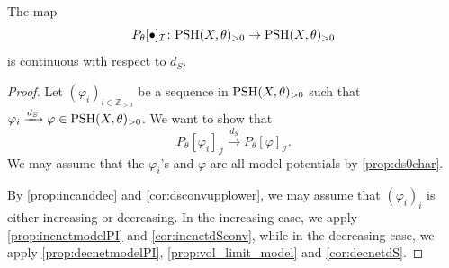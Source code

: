 \begin{theorem}\label{thm:contPI}
    The map
    \[
        P_{\theta}[\bullet]_{\mathcal{I}}\colon \mathrm{PSH}(X,\theta)_{>0}\rightarrow \mathrm{PSH}(X,\theta)_{>0}
    \]
    is continuous with respect to $d_S$.
   \end{theorem}
   \begin{proof}
       Let $(\varphi_i)_{i\in \mathbb{Z}_{>0}}$ be a sequence in $\mathrm{PSH}(X,\theta)_{>0}$ such that $\varphi_i\xrightarrow{d_S}\varphi\in \mathrm{PSH}(X,\theta)_{>0}$. We want to show that
       \begin{equation}
           P_{\theta}[\varphi_i]_{\mathcal{I}}\xrightarrow{d_S}P_{\theta}[\varphi]_{\mathcal{I}}.
       \end{equation}
       We may assume that the $\varphi_i$'s and $\varphi$ are all model potentials by \cref{prop:ds0char}.


       By \cref{prop:incanddec} and \cref{cor:dsconvupplower}, we may assume that $(\varphi_i)_i$ is either increasing or decreasing.
       In the increasing case, we apply \cref{prop:incnetmodelPI} and \cref{cor:incnetdSconv}, while in the decreasing case, we apply \cref{prop:decnetmodelPI}, \cref{prop:vol_limit_model} and \cref{cor:decnetdS}.
    \end{proof}

